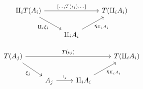 \begin{mainbox}{}
\begin{prop}
\begin{equation}
\begin{tikzcd}
\amalg_iT(A_i) \arrow[rr, "{[\ldots,T(\iota_i),\ldots]}"] \arrow[rd, "\amalg_i \xi_i"'] &                                           & T(\amalg_iA_i) \\
                                                                                    & \amalg_iA_i \arrow[ru, "\eta_{\amalg_iA_i}"'] &             
\end{tikzcd}
\end{equation}

\begin{equation}\label{diagr 3 coproducts}
\begin{tikzcd}
T(A_j) \arrow[rrr, "T(\iota_j)"] \arrow[rd, "\xi_{j}"'] &                          &                                                & T(\amalg_i A_i) \\
                                                        & A_j \arrow[r, "\iota_j"] & \amalg_iA_i \arrow[ru, "\eta_{\amalg_i A_i}"'] &                
\end{tikzcd}
\end{equation}
\end{prop}
\end{mainbox}

